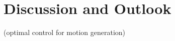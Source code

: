 \section{Discussion and Outlook}
\label{sec:discussion}

\cite{Tass12}\cite{Kuma13}(optimal control for motion generation)